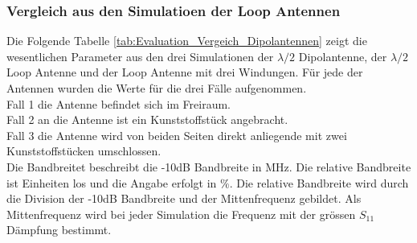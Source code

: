

\newpage
\subsubsection{Vergleich aus den Simulatioen der Loop Antennen}
Die Folgende Tabelle \ref{tab:Evaluation_Vergeich_Dipolantennen} zeigt die wesentlichen Parameter aus den drei Simulationen der $\lambda/2$ Dipolantenne, der $\lambda/2$ Loop Antenne und der Loop Antenne mit drei Windungen. Für jede der Antennen wurden die Werte für die drei Fälle aufgenommen.\\
Fall 1 die Antenne befindet sich im Freiraum.\\
Fall 2 an die Antenne ist ein Kunststoffstück angebracht.\\
Fall 3 die Antenne wird von beiden Seiten direkt anliegende mit zwei Kunststoffstücken umschlossen.\\
Die Bandbreitet beschreibt die -10dB Bandbreite in MHz. Die relative Bandbreite ist Einheiten los und die Angabe erfolgt in $\%$. Die relative Bandbreite wird durch die Division der -10dB Bandbreite und der Mittenfrequenz gebildet. Als Mittenfrequenz wird bei jeder Simulation die Frequenz mit der grössen $S_{11}$ Dämpfung bestimmt.\\

